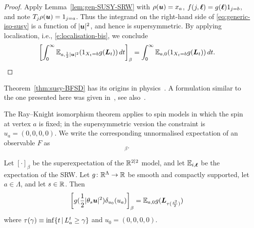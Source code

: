 \documentclass[11pt,a4paper]{article}
\begin{document}
\begin{proof}
  Apply Lemma~\ref{lem:gen-SUSY-SRW} with $\rho(\boldsymbol{u}) = x_a$,
  $f(j,\boldsymbol{\ell}) = g(\boldsymbol{\ell})1_{j=b}$, and note
  $T_j\rho(\boldsymbol{u}) = 1_{j=a}$. Thus
  the integrand on the right-hand side of \eqref{eq:generic-iso-susy}
  is a function of $|\boldsymbol{u}|^2$, and hence is
  supersymmetric. By applying
  localisation, i.e., \eqref{e:localisation-bis}, we conclude
  \begin{equation*}
    \uspin{\int_0^\infty \E_{a,\frac{1}{2}|\V{u}|^{2}} \pa{1_{X_t=b}g(\V{L}_t)}\, dt }_{\beta} = \int_0^\infty \E_{a,0} \pa{1_{X_t=b}g(\V{L}_t)}\, dt.\qedhere
  \end{equation*}
\end{proof}

\begin{remark}
  \label{rem:SUSY-GFF-origin}
  Theorem~\ref{thm:susy-BFSD} has its origins in
  physics~\cite{PhysRevLett.43.744,MR594576,MR660000,MR713539}.
  A formulation similar to
  the one presented here was given in~\cite{MR1100240}, see
  also~\cite{MR941982}.
\end{remark}

The Ray--Knight isomorphism theorem applies to spin models in which
the spin at vertex $a$ is fixed; in the supersymmetric version the
constraint is $u_a=(0,0,0,0)$.  We write the corresponding
unnormalised expectation of an observable $F$ as
\begin{equation}
  [F \delta_{u_0}(u_a)]_\beta.
\end{equation}


\begin{theorem}
  \label{thm:susy-eucl-rk}
  Let $[\cdot]_\beta$ be the superexpectation of the $\mathbb{R}^{2|2}$ model,
  and let $\mathbb{E}_{i,\boldsymbol{\ell}}$ be the expectation of the SRW.  Let
  $g\colon\mathbb{R}^{\Lambda}\to\mathbb{R}$ be smooth and compactly
    supported, %
  let $a\in\Lambda$, and let $s\in\mathbb{R}$.  Then
  \begin{equation}
    \uspin{ g(\frac{1}{2}|\theta_s\V{u}|^2)\delta_{u_0}(u_a)}_\beta = 
    \E_{a,0}g(\V{L}_{\tau(\frac{s^2}{2})}) 
  \end{equation}
  where $\tau(\gamma) \equiv \inf \{t \,| \,L_a^t \ge \gamma\}$ and $u_0 = (0,0,0,0)$.
\end{theorem}
\end{document}
